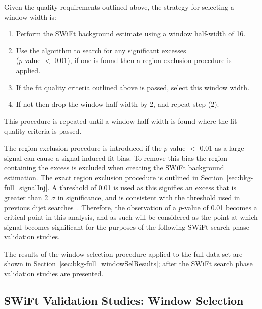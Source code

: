 \noindent
Given the quality requirements outlined above, the strategy for selecting a window width is:
\begin{enumerate}
\item Perform the SWiFt background estimate using a window half-width of 16.
\item Use the \bh{} algorithm to search for any significant excesses\\
  (\mbox{$p$-value} $<$ 0.01),  if one is found then a region exclusion procedure is applied.
\item If the fit quality criteria outlined above is passed, select this window width.
\item If not then drop the window half-width by 2, and repeat step (2).
\end{enumerate}
This procedure is repeated until a window half-width is found where the fit quality criteria is passed.

The region exclusion procedure is introduced if the \bh{} \mbox{$p$-value} $<$ 0.01 as a large signal can cause a signal induced fit bias.
To remove this bias the region containing the excess is excluded when creating the SWiFt background estimation.
The exact region exclusion procedure is outlined in Section~\ref{sec:bkg-full_signalInj}.
A threshold of 0.01 is used as this signifies an excess that is greater than 2~$\sigma$ in significance,
and is consistent with the threshold used in previous dijet searches~\cite{det-thesis_kate}.
Therefore, the observation of a \bh{} \mbox{$p$-value} of 0.01 becomes a critical point in this analysis,
and as such will be considered as the point at which signal becomes significant for the purposes of the following SWiFt search phase validation studies.

The results of the window selection procedure applied to the full data-set are shown in Section~\ref{sec:bkg-full_windowSelResults};
after the SWiFt search phase validation studies are presented.



\subsection{SWiFt Validation Studies: Window Selection}
\label{sec:bkg-full_windowSelTests} 

